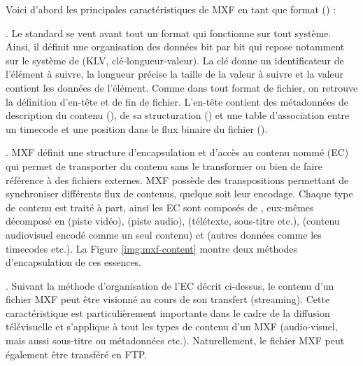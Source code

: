 Voici d'abord les principales caractéristiques de MXF en tant que format (\cite{Ferreira2010a}) : 
\begin{liste} 
	\item {}. 
	Le standard se veut avant tout un format qui fonctionne sur tout système. 
	Ainsi, il définit une organisation des données bit par bit qui repose notamment sur le système de  (KLV, clé-longueur-valeur). 
	La clé donne un identificateur de l'élément à suivre, la longueur précise la taille de la valeur à suivre et la valeur contient les données de l'élément.
	Comme dans tout format de fichier, on retrouve la définition d'en-tête et de fin de fichier. 
	L'en-tête contient des métadonnées de description du contenu (), de sa structuration () et une table d'association entre un timecode et une position dans le flux binaire du fichier ().

	\item {}.
	MXF définit une structure d'encapsulation et d'accès au contenu nommé  (EC) qui permet de transporter du contenu sans le transformer ou bien de faire référence à des fichiers externes.  
	MXF possède des transpositions permettant de synchroniser différents flux de contenus, quelque soit leur encodage. 
	Chaque type de contenu est traité à part, ainsi les EC sont composés de , eux-mêmes décomposé en  (piste vidéo),  (piste audio),  (télétexte, sous-titre etc.),  (contenu audiovisuel encodé comme un seul contenu) et  (autres données comme les timecodes etc.).
	La Figure \ref{img:mxf-content} montre deux méthodes d'encapsulation de ces essences.


	\item {}. 
	Suivant la méthode d'organisation de l'EC décrit ci-dessus, le contenu d'un fichier MXF peut être visionné au cours de son transfert (streaming). 
	Cette caractéristique est particulièrement importante dans le cadre de la diffusion télévisuelle et s'applique à tout les types de contenu d'un MXF (audio-visuel, mais aussi sous-titre ou métadonnées etc.). 
	Naturellement, le fichier MXF peut également être transféré en FTP.


\end{liste}
